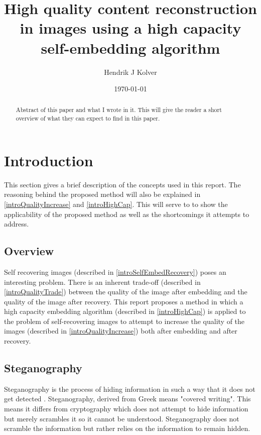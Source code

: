 \documentclass[11pt]{article}
\title{High quality content reconstruction in images using a high capacity self-embedding algorithm}
\author{Hendrik J Kolver}
\date{\today}
\begin{document}
\maketitle

\begin{abstract}

\noindent Abstract of this paper and what I wrote in it.
This will give the reader a short overview of what they can expect to find in this paper.

\end{abstract}

\tableofcontents

\section{Introduction}
This section gives a brief description of the concepts used in this report.
The reasoning behind the proposed method will also be explained in \ref{introQualityIncrease} and \ref{introHighCap}.
This will serve to to show the applicability of the proposed method as well as the shortcomings it attempts to address. 

\subsection{Overview}
Self recovering images (described in \ref{introSelfEmbedRecovery}) poses an interesting problem.
There is an inherent trade-off (described in \ref{introQualityTrade}) between the quality of the image after embedding and the quality of the image after recovery.
This report proposes a method in which a high capacity embedding algorithm (described in \ref{introHighCap}) is applied to the problem of self-recovering images to attempt to increase the quality of the images (described in \ref{introQualityIncrease}) both after embedding and after recovery.


\subsection{Steganography}
\label{introSteganography}
Steganography is the process of hiding information in such a way that it does not get detected \cite{johnson1998exploring}.
Steganography, derived from Greek means "covered writing".
This means it differs from cryptography which does not attempt to hide information but merely scrambles it so it cannot be understood.
Steganography does not scramble the information but rather relies on the information to remain hidden. 
\end{document}
